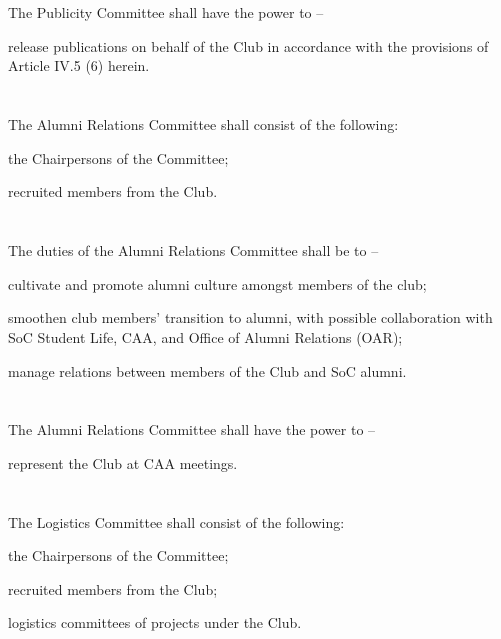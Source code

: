 \section{}
The Publicity Committee shall have the power to –
	\begin{legal}
	\item release publications on behalf of the Club in accordance with the provisions of Article IV.5 (6) herein.
	\end{legal}

\section{}
The Alumni Relations Committee shall consist of the following:
	\begin{legal}
	\item the Chairpersons of the Committee;
	\item recruited members from the Club.
	\end{legal}

\section{}
The duties of the Alumni Relations Committee shall be to –
	\begin{legal}
	\item cultivate and promote alumni culture amongst members of the club;
	\item smoothen club members' transition to alumni, with possible collaboration with SoC Student Life, CAA, and Office of Alumni Relations (OAR);
	\item manage relations between members of the Club and SoC alumni.
	\end{legal}

\section{}
The Alumni Relations Committee shall have the power to –
	\begin{legal}
	\item represent the Club at CAA meetings.
	\end{legal}

\section{}
The Logistics Committee shall consist of the following:
	\begin{legal}
	\item the Chairpersons of the Committee;
	\item recruited members from the Club;
	\item logistics committees of projects under the Club.
	\end{legal}

